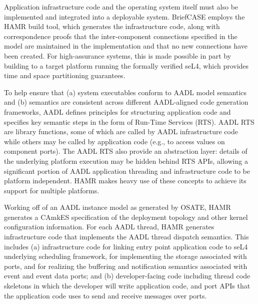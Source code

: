 Application infrastructure code and the operating system itself must also be implemented and integrated into a deployable system.  BriefCASE employs the HAMR build tool, which generates the infrastructure code, along with correspondence proofs that the inter-component connections specified in the model are maintained in the implementation and that no new connections have been created.  For high-assurance systems, this is made possible in part by building to a target platform running the formally verified seL4, which provides time and space partitioning guarantees.

To help ensure that (a) system executables conform to AADL model semantics and (b) semantics are consistent across different AADL-aligned code generation frameworks, AADL defines principles for structuring application code and specifies key semantic steps in the form of Run-Time Services (RTS). AADL RTS are library functions, some of which are called by AADL infrastructure code while others may be called by application code (e.g., to access values on component ports). The AADL RTS also provide an abstraction layer: details of the underlying platform execution may be hidden behind RTS APIs, allowing a significant portion of AADL application threading and infrastructure code to be platform independent. HAMR makes heavy use of these concepts to achieve its support for multiple platforms.

Working off of an AADL instance model as generated by OSATE, HAMR generates a CAmkES specification of the deployment topology and other kernel configuration information. For each AADL thread, HAMR generates infrastructure code that implements the AADL thread dispatch semantics. This includes (a) infrastructure code for linking entry point application code to seL4 underlying scheduling framework, for implementing the storage associated with ports, and for realizing the buffering and notification semantics associated with event and event data ports; and (b) developer-facing code including thread code skeletons in which the developer will write application code, and port APIs that the application code uses to send and receive messages over ports.


